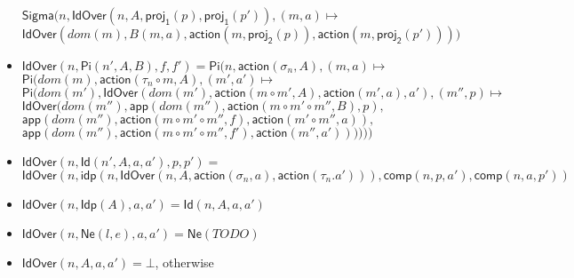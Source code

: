 \documentclass{amsart}
\theoremstyle{definition}
\theoremstyle{remark}
\newcommand{\D}{\mathsf{D}}
\newcommand{\nats}{\mathbb{N}}
\numberwithin{table}{section}
\begin{document}
\begin{itemize}
    \indent $\mathsf{Sigma}(n, \mathsf{IdOver}(n, A, \mathsf{proj_1}(p), \mathsf{proj_1}(p')), (m,a) \mapsto$ \\
    \indent $\mathsf{IdOver}(dom(m), B(m,a), \mathsf{action}(m, \mathsf{proj_2}(p)), \mathsf{action}(m, \mathsf{proj_2}(p'))))$
\item[] $\mathsf{IdOver}(n, \mathsf{Pi}(n', A, B), f, f') = \mathsf{Pi}(n, \mathsf{action}(\sigma_n, A), (m,a) \mapsto$ \\
    \indent $\mathsf{Pi}(dom(m), \mathsf{action}(\tau_n \circ m, A), (m',a') \mapsto$ \\
    \indent $\mathsf{Pi}(dom(m'), \mathsf{IdOver}(dom(m'), \mathsf{action}(m \circ m', A), \mathsf{action}(m', a), a'), (m'',p) \mapsto$ \\
    \indent $\mathsf{IdOver}(dom(m''), \mathsf{app}(dom(m''), \mathsf{action}(m \circ m' \circ m'', B), p),$ \\
    \indent \indent $\mathsf{app}(dom(m''), \mathsf{action}(m \circ m' \circ m'', f), \mathsf{action}(m' \circ m'', a)),$ \\
    \indent \indent $\mathsf{app}(dom(m''), \mathsf{action}(m \circ m' \circ m'', f'), \mathsf{action}(m'', a'))))))$
\item[] $\mathsf{IdOver}(n, \mathsf{Id}(n', A, a, a'), p, p') =$ \\
    \indent $\mathsf{IdOver}(n, \mathsf{idp}(n, \mathsf{IdOver}(n, A, \mathsf{action}(\sigma_n, a), \mathsf{action}(\tau_n. a'))), \mathsf{comp}(n, p, a'), \mathsf{comp}(n, a, p'))$
\item[] $\mathsf{IdOver}(n, \mathsf{Idp}(A), a, a') = \mathsf{Id}(n, A, a, a')$
\item[] $\mathsf{IdOver}(n, \mathsf{Ne}(l, e), a, a') = \mathsf{Ne}(TODO)$
\item[] $\mathsf{IdOver}(n, A, a, a') = \bot$, otherwise
\end{itemize}

\begin{comment}
The rest of the functions we used in the definition of $\llbracket - \rrbracket$ will be defined later in this section.

If $A$ is a term, then let $P^{(n)} A$ denote a term defined as follows: $P^{(0)} A = A$ and
$P^{(n + 1)} A = \Sigma A (\Sigma (\Uparrow^1\hspace{-.5em} A) (P^{(n)}(v_1 = v_0\,|\,idp\,(\Uparrow^2\hspace{-.5em} A))))$.
If $A \in \D$, then let $\mathsf{P}^{(n)} A = \llbracket P^{(n)} v_0 \rrbracket^{[0 \mapsto A, n \mapsto \bot]}_\diamond$.
For each $n \in \nats$, define $\mathsf{s}_n,\mathsf{t}_n,\mathsf{c}_n : \D \to \D$ as follows:
$\mathsf{c}_0(x) = x$, $\mathsf{c}_{n + 1} = \mathsf{c}_n \circ \mathsf{proj_2} \circ \mathsf{proj_2}$,
$\mathsf{s}_n = \mathsf{proj_1} \circ \mathsf{c}_n$, and $\mathsf{t}_n = \mathsf{proj_1} \circ \mathsf{proj_2} \circ \mathsf{c}_n$.
\end{comment}
\end{document}
